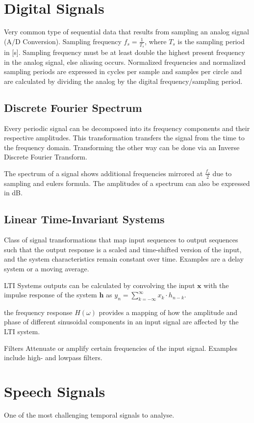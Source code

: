 
\section{Digital Signals}
Very common type of sequential data that results from sampling an analog signal (A/D Conversion).
Sampling frequency $ f_s = \frac{1}{T_s} $, where $ T_s $ is the sampling period in [s]. Sampling frequency must be at least double the highest present
frequency in the analog signal, else aliasing occurs.
Normalized frequencies and normalized sampling periods are expressed in cycles per sample and samples per circle
and are calculated by dividing the analog by the digital frequency/sampling period.

\subsection{Discrete Fourier Spectrum}
Every periodic signal can be decomposed into its frequency components and their respective amplitudes.
This transformation transfers the signal from the time to the frequency domain.
Transforming the other way can be done via an Inverse Discrete Fourier Transform.

The spectrum of a signal shows additional frequencies mirrored at $ \frac{f_s} {2} $ due to sampling and eulers formula.
The amplitudes of a spectrum can also be expressed in dB.

\subsection{Linear Time-Invariant Systems}
Class of signal transformations that map input sequences to output sequences such that the output response is a scaled and time-shifted version of the input,
and the system characteristics remain constant over time. Examples are a delay system or a moving average.

LTI Systems outputs can be calculated by convolving the input $ \textbf{x} $ with the impulse response of the system
$ \textbf{h} $ as $ y_n = \sum_{k=-\infty}^{\infty} x_k \cdot h_{n-k} $.

the frequency response $ H(\omega) $ provides a mapping of how the amplitude and phase of different sinusoidal components in an input signal are affected by the LTI system.

Filters Attenuate or amplify certain frequencies of the input signal. Examples include high- and lowpass filters.

\section{Speech Signals}
One of the most challenging temporal signals to analyse.


